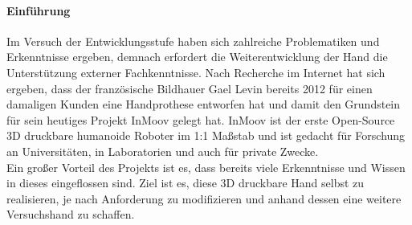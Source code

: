 \documentclass[titlepage,12pt,twoside]{article}
\begin{document}
\paragraph{Einführung}
\hfill \break
\hfill \break
Im Versuch der Entwicklungsstufe  haben sich zahlreiche Problematiken und 
Erkenntnisse ergeben, demnach erfordert die Weiterentwicklung der Hand 
die Unterstützung externer Fachkenntnisse.
Nach Recherche im Internet hat sich ergeben, dass der französische 
Bildhauer Gael Levin bereits 2012 für einen damaligen Kunden eine Handprothese 
entworfen hat und damit den Grundstein für sein heutiges Projekt 
InMoov gelegt hat. InMoov ist der erste Open-Source 3D druckbare humanoide 
Roboter im 1:1 Maßstab und ist gedacht für Forschung an Universitäten, in 
Laboratorien und auch für private Zwecke. \\
Ein großer Vorteil des Projekts ist es, dass bereits viele Erkenntnisse und 
Wissen in dieses eingeflossen sind. Ziel ist es, diese 3D druckbare Hand 
selbst zu realisieren, je nach Anforderung zu modifizieren und anhand dessen 
eine weitere Versuchshand zu schaffen. \\
\\
\end{document}
